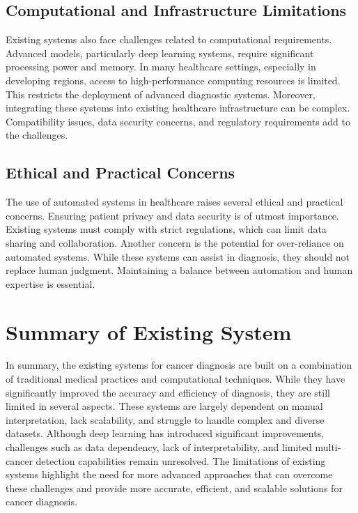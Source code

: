 \documentclass[a4paper,12pt]{report}
\begin{document}
\begin{doublespace}
\subsection{Computational and Infrastructure Limitations}
\label{sec:2.9}

Existing systems also face challenges related to computational requirements. Advanced models, particularly deep learning systems, require significant processing power and memory.
In many healthcare settings, especially in developing regions, access to high-performance computing resources is limited. This restricts the deployment of advanced diagnostic systems.
Moreover, integrating these systems into existing healthcare infrastructure can be complex. Compatibility issues, data security concerns, and regulatory requirements add to the challenges.



\subsection{ Ethical and Practical Concerns}
\label{sec:2.10}

The use of automated systems in healthcare raises several ethical and practical concerns. Ensuring patient privacy and data security is of utmost importance. Existing systems must comply with strict regulations, which can limit data sharing and collaboration.
Another concern is the potential for over-reliance on automated systems. While these systems can assist in diagnosis, they should not replace human judgment. Maintaining a balance between automation and human expertise is essential.

\section{Summary of Existing System}
\label{sec:2.11}
In summary, the existing systems for cancer diagnosis are built on a combination of traditional medical practices and computational techniques. While they have significantly improved the accuracy and efficiency of diagnosis, they are still limited in several aspects.
These systems are largely dependent on manual interpretation, lack scalability, and struggle to handle complex and diverse datasets.
Although deep learning has introduced significant improvements, challenges such as data dependency, lack of interpretability, and limited multi-cancer detection capabilities remain unresolved.
The limitations of existing systems highlight the need for more advanced approaches that can overcome these challenges and provide more accurate, efficient, and scalable solutions for cancer diagnosis.



\end{doublespace}
\end{document}
